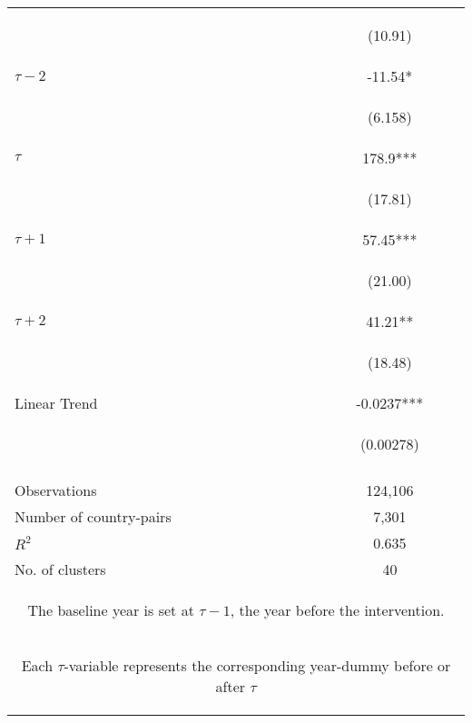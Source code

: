 \documentclass{article}
\begin{document}
\begin{table}[htbp]
{\begin{tabular}{lc}
\vspace{4pt} & \begin{footnotesize}(10.91)\end{footnotesize} \\
$\tau - 2$  & -11.54* \\
\vspace{4pt} & \begin{footnotesize}(6.158)\end{footnotesize} \\
$\tau$  & 178.9*** \\
\vspace{4pt} & \begin{footnotesize}(17.81)\end{footnotesize} \\
$\tau + 1$  & 57.45*** \\
\vspace{4pt} & \begin{footnotesize}(21.00)\end{footnotesize} \\
$\tau + 2$ & 41.21** \\
\vspace{4pt} & \begin{footnotesize}(18.48)\end{footnotesize} \\
Linear Trend & -0.0237*** \\
 & \begin{footnotesize}(0.00278)\end{footnotesize} \\
\vspace{4pt} & \begin{footnotesize}\end{footnotesize} \\
Observations & 124,106 \\
Number of country-pairs & 7,301 \\
$R^2$ & 0.635 \\ 
No. of clusters & 40 \\ \hline
\multicolumn{2}{c}{\begin{footnotesize} The baseline year is set at $\tau - 1$, the year before the intervention. \end{footnotesize}} \\
\multicolumn{2}{c}{\begin{footnotesize} Each $\tau$-variable represents the corresponding year-dummy before or after $\tau$ \end{footnotesize}} \\ 

\end{tabular}}
\end{table}
\end{document}

